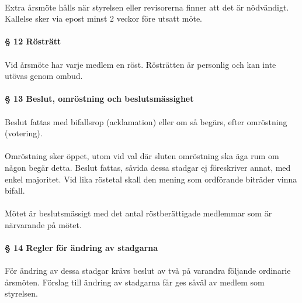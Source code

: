 \documentclass[12pt, a4paper]{article}
\begin{document}
\paragraph{}
Extra årsmöte hålls när styrelsen eller revisorerna finner att det är nödvändigt. Kallelse sker via epost minst 2 veckor före utsatt möte.

\paragraph{§ 12 Rösträtt}
\paragraph{}
Vid årsmöte har varje medlem en röst. Rösträtten är personlig och kan inte utövas genom ombud.

\paragraph{§ 13 Beslut, omröstning och beslutsmässighet}
\paragraph{}
Beslut fattas med bifallsrop (acklamation) eller om så begärs, efter omröstning (votering).

\paragraph{}
Omröstning sker öppet, utom vid val där sluten omröstning ska äga rum om någon begär detta. Beslut fattas, såvida dessa stadgar ej föreskriver
annat, med enkel majoritet. Vid lika röstetal skall den mening som ordförande biträder vinna bifall.

\paragraph{}
Mötet är beslutsmässigt med det antal röstberättigade medlemmar som är närvarande på mötet.

\paragraph{§ 14 Regler för ändring av stadgarna}
\paragraph{}
För ändring av dessa stadgar krävs beslut av två på varandra följande ordinarie årsmöten. Förslag till ändring av stadgarna får ges såväl av medlem som styrelsen.
\end{document}
